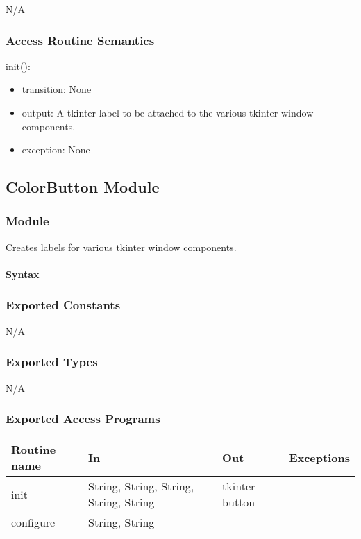 \documentclass[12pt]{article}
\begin{document}
N/A

\subsubsection* {Access Routine Semantics}

\noindent init():
\begin{itemize}
\item transition: None
\item output: A tkinter label to be attached to the various tkinter window components.
\item exception: None
\end{itemize}

\subsection*{ColorButton Module}

\subsubsection*{Module}

Creates labels for various tkinter window components.

\paragraph*{Syntax}

\subsubsection*{Exported Constants}
N/A
\subsubsection*{Exported Types}

N/A

\subsubsection* {Exported Access Programs}

\begin{tabular}{| l | l | l | l |}
\hline
\textbf{Routine name} & \textbf{In} & \textbf{Out} & \textbf{Exceptions}\\
\hline
init & String, String, String, String, String & tkinter button & \\
\hline
configure & String, String & & \\
\hline
\end{tabular}
\end{document}
